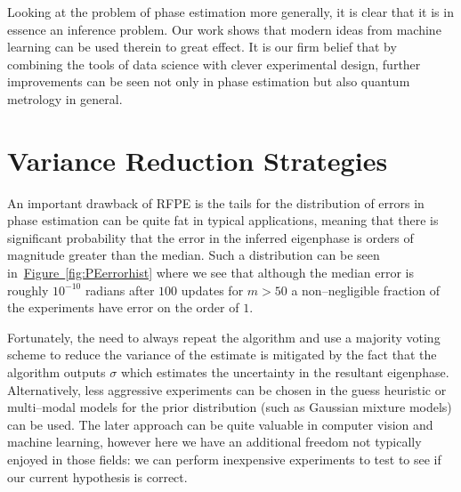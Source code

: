 \documentclass[aps,pra,amsmath,twocolumn,amssymb,superscriptaddress]{revtex4-1}
\newcommand{\fig}[1]{\hyperref[fig:#1]{Figure~\ref*{fig:#1}}}
\begin{document}
Looking at the problem of phase estimation more generally, it is clear that it is in essence an inference problem.
Our work shows that modern ideas from machine learning can be used therein to great effect.  
It is our firm belief that by combining the tools of data science with clever experimental design,
further improvements can be seen not only in phase estimation but also quantum metrology in general.


% 

\pagebreak
\appendix


\onecolumngrid

\section{Variance Reduction Strategies}
\label{app:var-reduction}

An important drawback of RFPE is  the tails for the distribution of errors in phase estimation can be quite fat in typical applications, meaning that there is significant probability that the error in the inferred eigenphase is orders of magnitude greater than the median.  Such a distribution can be seen in~\fig{PEerrorhist} where we see that although the median error is roughly $10^{-10}$ radians after $100$ updates for $m>50$  a non--negligible fraction of the experiments have error on the order of $1$.    

Fortunately, the need to always repeat the algorithm and use a majority voting scheme to reduce the variance of the estimate is mitigated by the fact that the algorithm outputs $\sigma$ which estimates the uncertainty in the resultant eigenphase. 
Alternatively, less aggressive experiments can be chosen in the guess heuristic or multi--modal models for the prior distribution (such as Gaussian mixture models) can be used.  The later approach can be quite valuable in computer vision and machine learning, however here we have an additional freedom not typically enjoyed in those fields: we can perform inexpensive experiments to test to see if our current hypothesis is correct.
\end{document}
